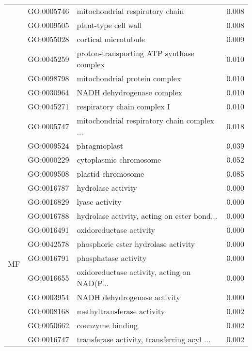 \begin{longtable}{lllr}
   & GO:0005746 &              mitochondrial respiratory chain &         0.008 \\
   & GO:0009505 &                         plant-type cell wall &         0.008 \\
   & GO:0055028 &                         cortical microtubule &         0.009 \\
   & GO:0045259 &     proton-transporting ATP synthase complex &         0.010 \\
   & GO:0098798 &                mitochondrial protein complex &         0.010 \\
   & GO:0030964 &                   NADH dehydrogenase complex &         0.010 \\
   & GO:0045271 &                  respiratory chain complex I &         0.010 \\
   & GO:0005747 &  mitochondrial respiratory chain complex ... &         0.018 \\
   & GO:0009524 &                                 phragmoplast &         0.039 \\
   & GO:0000229 &                       cytoplasmic chromosome &         0.052 \\
   & GO:0009508 &                           plastid chromosome &         0.085 \\
\cline{1-4}
\multirow{79}{*}{MF} & GO:0016787 &                           hydrolase activity &         0.000 \\
   & GO:0016829 &                               lyase activity &         0.000 \\
   & GO:0016788 &  hydrolase activity, acting on ester bond... &         0.000 \\
   & GO:0016491 &                      oxidoreductase activity &         0.000 \\
   & GO:0042578 &          phosphoric ester hydrolase activity &         0.000 \\
   & GO:0016791 &                         phosphatase activity &         0.000 \\
   & GO:0016655 &  oxidoreductase activity, acting on NAD(P... &         0.000 \\
   & GO:0003954 &                  NADH dehydrogenase activity &         0.000 \\
   & GO:0008168 &                   methyltransferase activity &         0.002 \\
   & GO:0050662 &                             coenzyme binding &         0.002 \\
   & GO:0016747 &  transferase activity, transferring acyl ... &         0.002 \\

\end{longtable}

